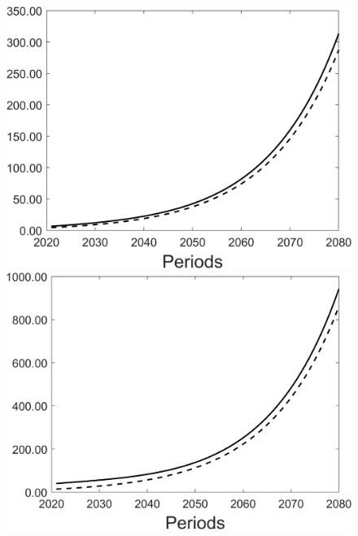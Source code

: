 \begin{figure}[h!!]
\begin{minipage}[]{0.32\textwidth}
\end{minipage}
\begin{minipage}[]{0.32\textwidth}
\includegraphics[width=1\textwidth]{../../codding_model/Own/figures/Rep_agent/staticRam_LF_separate_yd_periods59_eppsilon4.00_zeta1.40_Ad08_Ac04_thetac0.70_thetad0.56_HetGrowth1_tauul0.181_util0_withtarget0_lgd0.png}
\end{minipage}
\begin{minipage}[]{0.32\textwidth}
\includegraphics[width=1\textwidth]{../../codding_model/Own/figures/Rep_agent/staticRam_LF_separate_xd_periods59_eppsilon4.00_zeta1.40_Ad08_Ac04_thetac0.70_thetad0.56_HetGrowth1_tauul0.181_util0_withtarget0_lgd0.png}

\end{minipage}
\end{figure}
